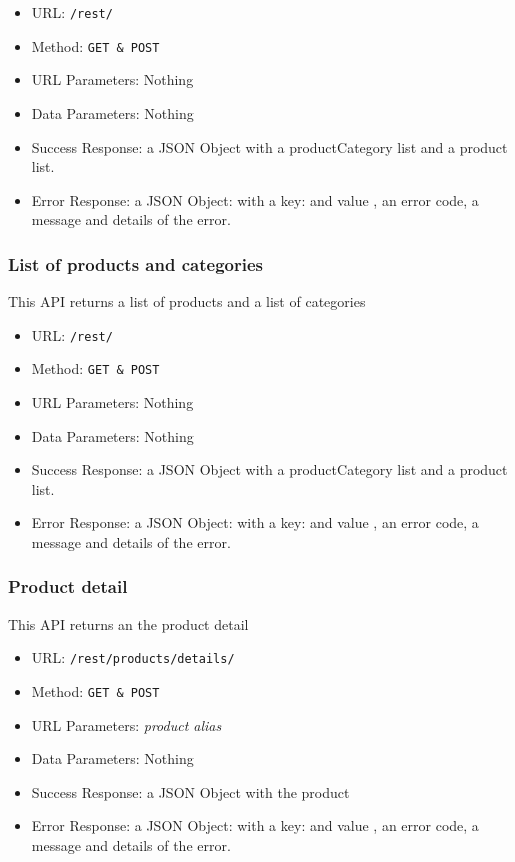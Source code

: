 \begin{itemize}
    \item URL: \texttt{/rest/}
    \item Method: \texttt{GET \& POST}
    \item URL Parameters: Nothing
    \item Data Parameters: Nothing
    \item Success Response: a JSON Object with a productCategory list and a product list.
    \item Error Response: a JSON Object: with a key:   and value , an error code, a message and details of the error.

\end{itemize}

\subsubsection*{List of products and categories}

This API returns a list of products and a list of categories

\begin{itemize}
    \item URL: \texttt{/rest/}
    \item Method: \texttt{GET \& POST}
    \item URL Parameters: Nothing
    \item Data Parameters: Nothing
    \item Success Response: a JSON Object with a productCategory list and a product list.
    \item Error Response: a JSON Object: with a key:   and value , an error code, a message and details of the error.
    
\end{itemize}

\subsubsection*{Product detail}

This API returns an the product detail

\begin{itemize}
    \item URL: \texttt{/rest/products/details/}
    \item Method: \texttt{GET \& POST}
    \item URL Parameters: \textit{product alias}
    \item Data Parameters: Nothing
    \item Success Response: a JSON Object with the product
    \item Error Response: a JSON Object: with a key:   and value , an error code, a message and details of the error.
\end{itemize}

